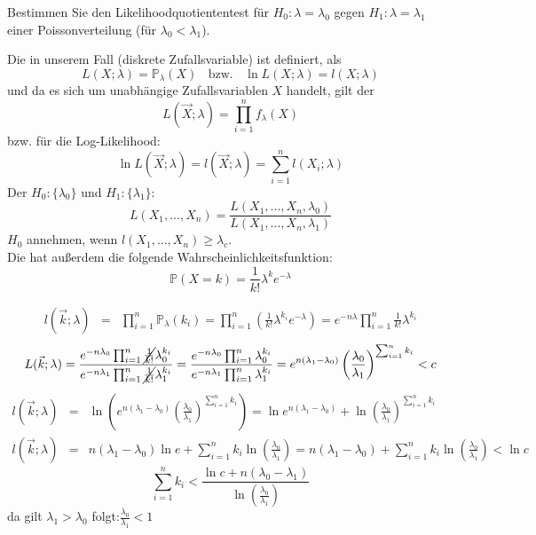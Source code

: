 \begin{uebsp}
\begin{Exercise}[label=ex:9.1]
Bestimmen Sie den Likelihoodquotiententest für $H_0:\lambda=\lambda_0$ gegen $H_1:\lambda=\lambda_1$ einer Poissonverteilung (für $\lambda_0<\lambda_1$).
\end{Exercise}
\begin{Answer}
\begin{uebsp_theory}
Die  in unserem Fall (diskrete Zufallsvariable) ist definiert, als 
\[L(X;\lambda)=\mathbb P_\lambda(X)\;\;\text{ bzw. }\;\;\ln L(X;\lambda)=l(X;\lambda)\]
und da es sich um unabhängige Zufallsvariablen $X$ handelt, gilt der 
\[L(\vec X;\lambda)=\prod_{i=1}^nf_\lambda(X)\]
bzw. für die Log-Likelihood:
\[\ln L(\vec X;\lambda)=l(\vec X;\lambda)=\sum_{i=1}^nl(X_i;\lambda)\]
Der  $H_0:\{\lambda_0\}$ und $H_1:\{\lambda_1\}$:
\[L(X_1,...,X_n)=\frac{L(X_1,...,X_n,\lambda_0)}{L(X_1,...,X_n,\lambda_1)}\]
$H_0$ annehmen, wenn $l(X_1,...,X_n)\geq\lambda_c$.\\

Die  hat außerdem die folgende Wahrscheinlichkeitsfunktion:
\[
\mathbb P\left(X=k\right)=\frac{1}{k!}\lambda ^{k}e^{-\lambda }
\]
\end{uebsp_theory}
\begin{eqnarray*}l(\vec k;\lambda)&=&\prod_{i=1}^n\mathbb P_\lambda(k_i)=\prod_{i=1}^n\left(\frac{1}{k!}\lambda ^{k_i}e^{-\lambda }\right)=e^{-n\lambda}\prod_{i=1}^n\frac{1}{k!}\lambda ^{k_i}
\end{eqnarray*}
\[L(\vec k;\lambda)=\frac{e^{-n\lambda_0}\prod_{i=1}^n\cancel{\frac{1}{{k!}}}\lambda_0^{k_i}}{e^{-n\lambda_1}\prod_{i=1}^n\cancel{\frac{1}{k!}}\lambda_1^{k_i}}=\frac{e^{-n\lambda_0}\prod_{i=1}^n\lambda_0^{k_i}}{e^{-n\lambda_1}\prod_{i=1}^n\lambda_1^{k_i}}=e^{n(\lambda_1-\lambda_0)}\left(\frac{\lambda_0}{\lambda_1}\right)^{\sum_{i=1}^nk_i}<c\]
\begin{eqnarray*}l(\vec k;\lambda)&=&\ln\left(e^{n(\lambda_1-\lambda_0)}\left(\frac{\lambda_0}{\lambda_1}\right)^{\sum_{i=1}^nk_i}\right)=\ln e^{n(\lambda_1-\lambda_0)}+\ln \left(\frac{\lambda_0}{\lambda_1}\right)^{\sum_{i=1}^nk_i}\\
l(\vec k;\lambda)&=&{n(\lambda_1-\lambda_0)}\ln e+{\sum_{i=1}^nk_i}\ln \left(\frac{\lambda_0}{\lambda_1}\right)={n(\lambda_1-\lambda_0)}+{\sum_{i=1}^nk_i}\ln \left(\frac{\lambda_0}{\lambda_1}\right)<\ln c
\end{eqnarray*}
\[{\sum_{i=1}^nk_i}<\frac{\ln c+n(\lambda_0-\lambda_1)}{\ln \left(\frac{\lambda_0}{\lambda_1}\right)}\]
da gilt $\lambda_1>\lambda_0$ folgt:$\frac{\lambda_0}{\lambda_1}<1$
\end{Answer}
\end{uebsp}
